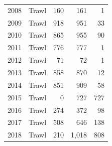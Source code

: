 \documentclass[
  english,
]{article}
\begin{document}
\begin{longtable}{rlrrr}
2008 & Trawl & 160 & 161 & 1 \\ 
2009 & Trawl & 918 & 951 & 33 \\ 
2010 & Trawl & 865 & 955 & 90 \\ 
2011 & Trawl & 776 & 777 & 1 \\ 
2012 & Trawl & 71 & 72 & 1 \\ 
2013 & Trawl & 858 & 870 & 12 \\ 
2014 & Trawl & 851 & 909 & 58 \\ 
2015 & Trawl & 0 & 727 & 727 \\ 
2016 & Trawl & 274 & 372 & 98 \\ 
2017 & Trawl & 508 & 646 & 138 \\ 
2018 & Trawl & 210 & 1,018 & 808 \\ 
\bottomrule

\end{longtable}

\endgroup

\pagebreak

\begingroup
\fontsize{9.0pt}{11.0pt}\selectfont
\end{document}

